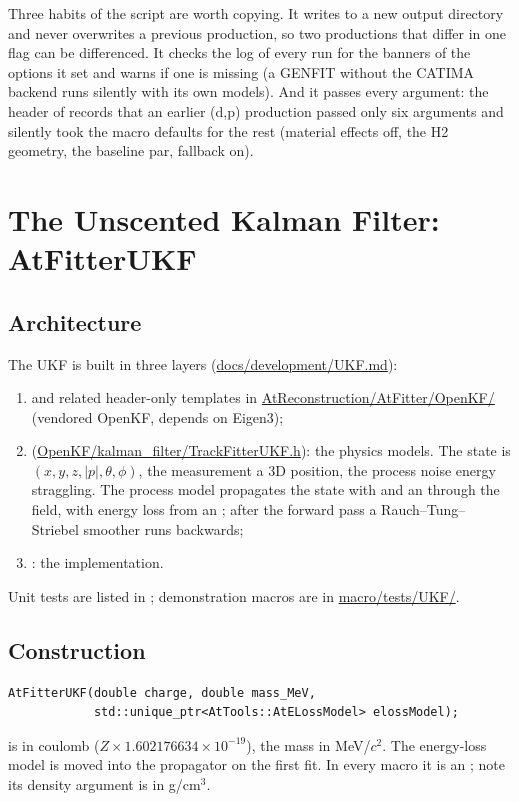 Three habits of the script are worth copying. It writes to a new output directory and never overwrites a previous
production, so two productions that differ in one flag can be differenced. It checks the log of every run for the
banners of the options it set and warns if one is missing (a GENFIT without the CATIMA backend runs silently with its
own models). And it passes every argument: the header of  records that an earlier (d,p)
production passed only six arguments and silently took the macro defaults for the rest (material effects off, the H2
geometry, the baseline par, fallback on).

\section{The Unscented Kalman Filter: AtFitterUKF}
\label{sec:ukf}

\subsection{Architecture}

The UKF is built in three layers (\url{docs/development/UKF.md}):
\begin{enumerate}
\item {} and related header-only templates in \url{AtReconstruction/AtFitter/OpenKF/}
  (vendored OpenKF, depends on Eigen3);
\item {} (\url{OpenKF/kalman_filter/TrackFitterUKF.h}): the physics models. The state is
  $(x, y, z, |p|, \theta, \phi)$, the measurement a 3D position, the process noise energy straggling. The process model
  propagates the state with  and an  through the field, with energy loss
  from an ; after the forward pass a Rauch--Tung--Striebel smoother runs backwards;
\item {}: the  implementation.
\end{enumerate}
Unit tests are listed in ; demonstration macros are in \url{macro/tests/UKF/}.

\subsection{Construction}

\begin{verbatim}
AtFitterUKF(double charge, double mass_MeV,
            std::unique_ptr<AtTools::AtELossModel> elossModel);
\end{verbatim}
 is in coulomb ($Z \times 1.602176634\times10^{-19}$), the mass in MeV/$c^2$. The energy-loss model is
moved into the propagator on the first fit. In every macro it is an ; note its density
argument is in g/cm$^3$.


